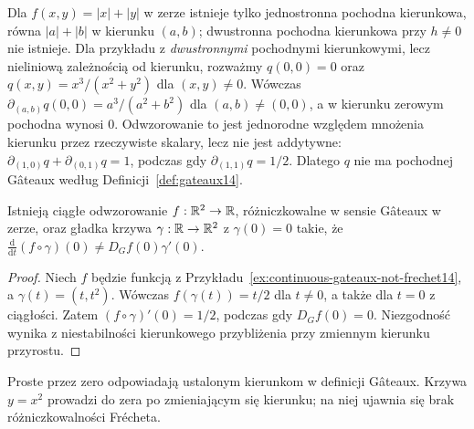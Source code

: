 \begin{przyklad}
\label{ex:nonlinear-directional14}
Dla $f(x,y)=|x|+|y|$ w zerze istnieje tylko jednostronna pochodna kierunkowa, równa $|a|+|b|$ w kierunku $(a,b)$; dwustronna pochodna kierunkowa przy $h\ne0$ nie istnieje. Dla przykładu z \emph{dwustronnymi} pochodnymi kierunkowymi, lecz nieliniową zależnością od kierunku, rozważmy $q(0,0)=0$ oraz $q(x,y)=x^3/(x^2+y^2)$ dla $(x,y)\ne0$. Wówczas $\partial_{(a,b)}q(0,0)=a^3/(a^2+b^2)$ dla $(a,b)\ne(0,0)$, a w kierunku zerowym pochodna wynosi $0$. Odwzorowanie to jest jednorodne względem mnożenia kierunku przez rzeczywiste skalary, lecz nie jest addytywne: $\partial_{(1,0)}q+\partial_{(0,1)}q=1$, podczas gdy $\partial_{(1,1)}q=1/2$. Dlatego $q$ nie ma pochodnej Gâteaux według Definicji~\ref{def:gateaux14}.
\end{przyklad}

\begin{stwierdzenie}
\label{prop:chain-fails14}
Istnieją ciągłe odwzorowanie $f:\mathbb R^2\to\mathbb R$, różniczkowalne w sensie Gâteaux w zerze, oraz gładka krzywa $\gamma:\mathbb R\to\mathbb R^2$ z $\gamma(0)=0$ takie, że $\frac{\mathrm d}{\mathrm dt}(f\circ\gamma)(0)\ne D_Gf(0)\gamma'(0)$.
\end{stwierdzenie}
\begin{proof}
Niech $f$ będzie funkcją z Przykładu~\ref{ex:continuous-gateaux-not-frechet14}, a $\gamma(t)=(t,t^2)$. Wówczas $f(\gamma(t))=t/2$ dla $t\ne0$, a także dla $t=0$ z ciągłości. Zatem $(f\circ\gamma)'(0)=1/2$, podczas gdy $D_Gf(0)=0$. Niezgodność wynika z niestabilności kierunkowego przybliżenia przy zmiennym kierunku przyrostu.
\end{proof}

\begin{center}

{\small Proste przez zero odpowiadają ustalonym kierunkom w definicji
Gâteaux. Krzywa $y=x^2$ prowadzi do zera po zmieniającym się
kierunku; na niej ujawnia się brak różniczkowalności Frécheta.}
\end{center}

